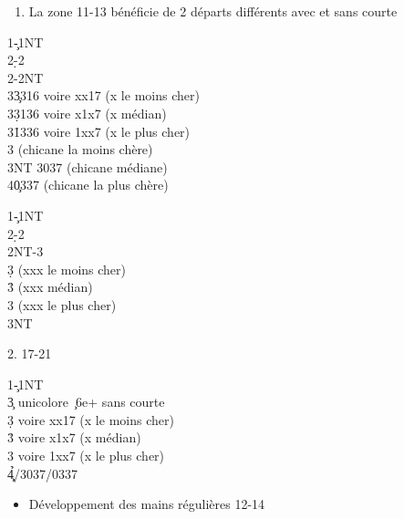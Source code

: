 \documentclass[a4paper]{article}
\begin{document}
\begin{enumerate}
\item La zone 11-13 bénéficie de 2 départs différents avec et sans courte

\end{enumerate}

\begin{bidtable}
1\c-1NT\\
2\d-2\h\\
2\s-2NT\\
3\c		3316 \> voire xx17 (x le moins cher)\\
3\d		3136 \> voire x1x7 (x médian)\\
3\h		1336 \> voire 1xx7 (x le plus cher)\\
3 \> (chicane la moins chère)\\
3NT		3037 \> (chicane médiane)\\
4\c		0337 \> (chicane la plus chère)
\end{bidtable}

\begin{bidtable}
1\c-1NT\\
2\d-2\h\\
2NT-3\c\\
3\d {} (xxx le moins cher)\\
3\h {} (xxx médian)\\
3\s {} (xxx le plus cher)\\
3NT 
\end{bidtable}

2. 17-21

\begin{bidtable}
1\c-1NT\\
3\c \> unicolore \c\ 6e+ sans courte\\
3\d {} voire xx17 (x le moins cher)\\
3\h {} voire x1x7 (x médian)\\
3\s {} voire 1xx7 (x le plus cher)\\
4\c\d\h {}/3037/0337
\end{bidtable}

\begin{itemize}
\item Développement des mains régulières 12-14

\end{itemize}
\end{document}
